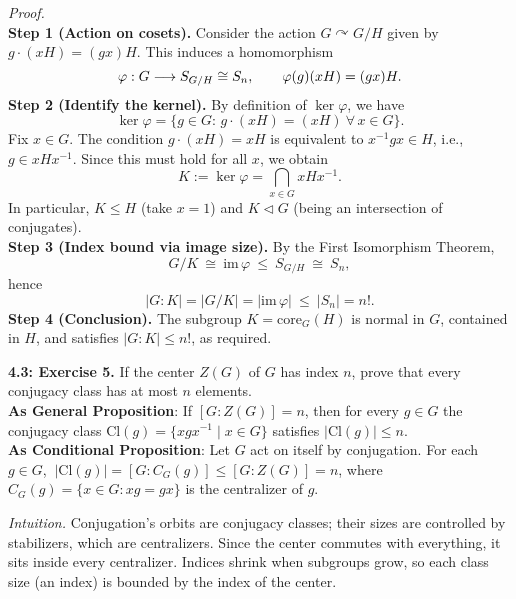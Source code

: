 \documentclass[11pt]{article}
\theoremstyle{definition}
\newcommand{\Cl}{\mathrm{Cl}}
\begin{document}
\dotfill

\emph{Proof.}\\
\textbf{Step 1 (Action on cosets).} Consider the action $G\curvearrowright G/H$ given by $g\cdot (xH)=(gx)H$. This induces a homomorphism
\[
\varphi:G\longrightarrow S_{G/H}\cong S_n,\qquad \varphi(g)(xH)=(gx)H.\\
\]
\textbf{Step 2 (Identify the kernel).} By definition of $\ker\varphi$, we have
\[
\ker\varphi=\{g\in G:\, g\cdot (xH)=(xH)\ \forall\,x\in G\}.
\]
Fix $x\in G$. The condition $g\cdot(xH)=xH$ is equivalent to $x^{-1}gx\in H$, i.e., $g\in xHx^{-1}$. Since this must hold for all $x$, we obtain
\[
K:=\ker\varphi=\bigcap_{x\in G} xHx^{-1}.
\]
In particular, $K\le H$ (take $x=1$) and $K\lhd G$ (being an intersection of conjugates).\\
\textbf{Step 3 (Index bound via image size).} By the First Isomorphism Theorem,
\[
G/K\ \cong\ \mathrm{im}\,\varphi\ \le\ S_{G/H}\ \cong\ S_n,
\]
hence
\[
|G:K|=|G/K|=|\mathrm{im}\,\varphi|\ \le\ |S_n|=n!.
\]
\textbf{Step 4 (Conclusion).} The subgroup $K=\mathrm{core}_G(H)$ is normal in $G$, contained in $H$, and satisfies $|G:K|\le n!$, as required.\\

\newpage

\newpage

\noindent \textbf{4.3: Exercise 5.} If the center $Z(G)$ of $G$ has index $n$, prove that every conjugacy class has at most $n$ elements.\\ %

\noindent\textbf{As General Proposition}: If $[G:Z(G)]=n$, then for every $g\in G$ the conjugacy class $\Cl(g)=\{xgx^{-1}\mid x\in G\}$ satisfies $|\Cl(g)|\le n$.\\

\noindent\textbf{As Conditional Proposition}: Let $G$ act on itself by conjugation. For each $g\in G$, $\ |\Cl(g)|=[G:C_G(g)]\le [G:Z(G)]=n$, where $C_G(g)=\{x\in G: xg=gx\}$ is the centralizer of $g$.

\newpage

\dotfill

\emph{Intuition.} Conjugation’s orbits are conjugacy classes; their sizes are controlled by stabilizers, which are centralizers. Since the center commutes with everything, it sits inside every centralizer. Indices shrink when subgroups grow, so each class size (an index) is bounded by the index of the center.\\

\dotfill
\end{document}
